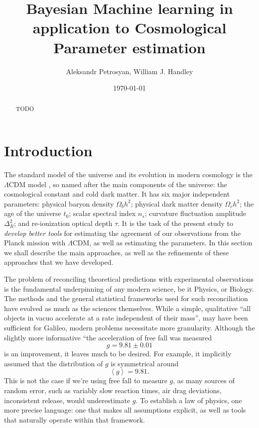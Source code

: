 \documentclass[usenatbib]{mnras}
\author{Aleksandr Petrosyan, William J. Handley}
\date{\today}
\title{Bayesian Machine learning in application to Cosmological Parameter estimation}
\begin{document}
\maketitle
\begin{abstract}
TODO
\end{abstract}

\section{Introduction}
\label{sec:org348b6d5}

The standard model of the universe and its evolution in modern
cosmology is the \(\Lambda\)CDM model \citep{Condon2018}, so named
after the main components of the universe: the cosmological constant
and cold dark matter. It has six major independent parameters:
physical baryon density \(\Omega_{b}h^{2}\); physical dark matter
density \(\Omega_{c}h^{2}\); the age of the universe \(t_{0}\); scalar
spectral index \(n_{s}\); curvature fluctuation amplitude
\(\Delta_{R}^{2}\); and re-ionization optical depth \(\tau\). It is the
task of the present study to \emph{develop better tools} for estimating
the agreement of our observations from the Planck mission with
\(\Lambda\)CDM, as well as estimating the parameters. In this
section we shall describe the main approaches, as well as the
refinements of these approaches that we have developed.

The problem of reconciling theoretical predictions with experimental
observations is the fundamental underpinning of any modern science,
be it Physics, or Biology. The methods and the general statistical
frameworks used for such reconciliation have evolved as much as the
sciences themselves. While a simple, qualitative ``all objects in
vacuo accelerate at a rate independent of their mass'', may have
been sufficient for Galileo, modern problems necessitate more
granularity. Although the slightly more informative ``the
acceleration of free fall was measured \[ g = 9.81 \pm 0.01\] is an
improvement, it leaves much to be desired. For example, it
implicitly assumed that the distribution of \(g\) is symmetrical
around \[ \left \langle g \right \rangle = 9.81.\] This is not the
case if we're using free fall to measure \(g\), as many sources of
random error, such as variably slow reaction times, air drag
deviations, inconsistent release, would underestimate \(g\).  To
establish a law of physics, one more precise language: one that
makes all assumptions explicit, as well as tools that naturally
operate within that framework.
\end{document}
